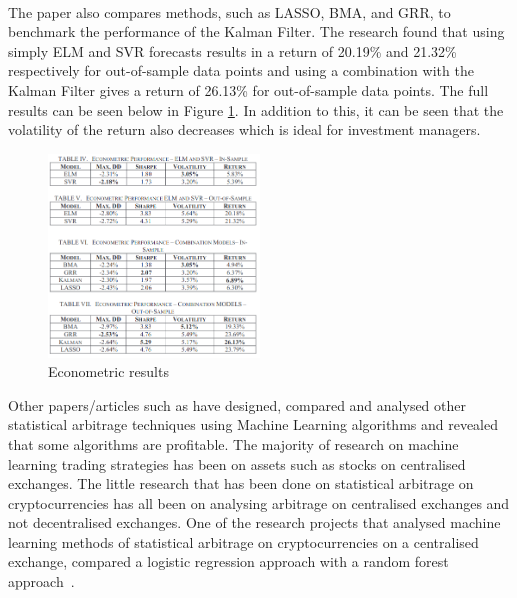 \\[3mm]
\noindent The paper also compares methods, such as LASSO, BMA, and GRR, to benchmark the performance of the Kalman Filter. The research found that using simply ELM and SVR forecasts results in a return of 20.19\% and 21.32\% respectively for out-of-sample data points and using a combination with the Kalman Filter gives a return of 26.13\% for out-of-sample data points. The full results can be seen below in Figure \ref{fig:kalman_ml_results}. In addition to this, it can be seen that the volatility of the return also decreases which is ideal for investment managers.
\begin{figure}[htb!]
    \centering
    \includegraphics[width=0.5\textwidth]{background/Images/kalman_ml_results.png}
    \caption{Econometric results~\cite{6974093}}
    \label{fig:kalman_ml_results}
\end{figure}

\noindent Other papers/articles such as \cite{KRAUSS2017689, alma991000475380901591, jrfm12010031} have designed, compared and analysed other statistical arbitrage techniques using Machine Learning algorithms and revealed that some algorithms are profitable. The majority of research on machine learning trading strategies has been on assets such as stocks on centralised exchanges. The little research that has been done on statistical arbitrage on cryptocurrencies has all been on analysing arbitrage on centralised exchanges and not decentralised exchanges. One of the research projects that analysed machine learning methods of statistical arbitrage on cryptocurrencies on a centralised exchange, compared a logistic regression approach with a random forest approach~\cite{jrfm12010031}. 


